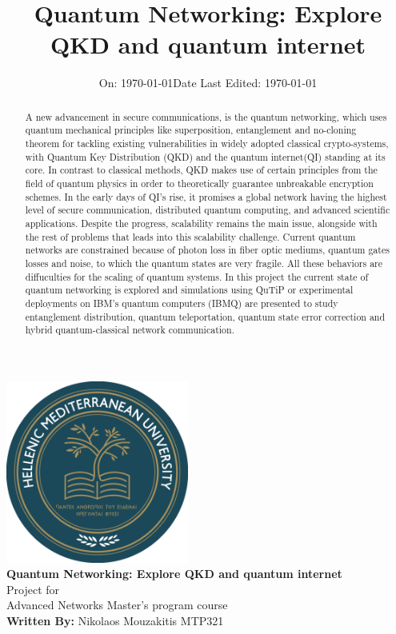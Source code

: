 \documentclass[12pt]{ieeetj}
\title{\LARGE \textbf{Quantum Networking: Explore QKD and quantum internet}}
\author{}
\date{\large On: \today}
\begin{document}
\onecolumn
\makeatletter
\begin{titlepage}
\centering
\vspace* {1cm}
{ \includegraphics[width=6cm]{ELMEPA.png}}\\[1cm]

{\LARGE \textbf{Quantum Networking: Explore QKD and quantum internet}}\\[1cm]
Project for\\[1cm]

	Advanced Networks Master's program course\\[0.5cm]



	\textbf{Written By:} {Nikolaos Mouzakitis MTP321}\\[1cm]
\date{\large Date Last Edited: \today}
{\@date\\}
\end{titlepage}
\makeatother


	\begin{abstract}

		A new advancement in secure communications, is the quantum networking,
		which uses quantum mechanical principles like superposition, entanglement and no-cloning 
		theorem for tackling existing vulnerabilities in widely adopted classical crypto-systems, 
		with Quantum Key Distribution (QKD) and the quantum internet(QI) standing at its core.
		In contrast to classical methods, QKD makes use of certain principles
		from the field of quantum physics in order to theoretically guarantee unbreakable encryption schemes.
		In the early days of QI's rise, it promises a global network having the highest level of
		secure communication, distributed quantum computing, and advanced scientific applications.
		Despite the progress, scalability remains the main issue, alongside with the rest of problems that leads 
		into this scalability challenge. 
		Current quantum networks are constrained because of photon loss
		in fiber optic mediums, quantum gates losses and noise, to which the quantum states
		are very fragile. All these behaviors are diffuculties for the scaling of quantum systems.
		In this project the current state of quantum networking is explored and simulations using QuTiP or
		experimental deployments on IBM’s quantum computers (IBMQ) are presented to study entanglement distribution,
		quantum teleportation, quantum state error correction and hybrid quantum-classical network communication.

	\end{abstract}
	
\end{document}
